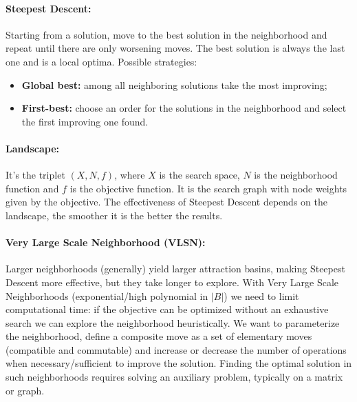 \documentclass{article}
\begin{document}
	\paragraph{Steepest Descent:} Starting from a solution, move to the best solution in the neighborhood and repeat until there are only worsening moves. The best solution is always the last one and is a local optima. Possible strategies: 
	\begin{itemize}
		\item \textbf{Global best:} among all neighboring solutions take the most improving;
		\item \textbf{First-best:} choose an order for the solutions in the neighborhood and select the first improving one found.\\
	\end{itemize}
	
	\paragraph{Landscape:} It's the triplet $(X,N,f)$, where $X$ is the search space, $N$ is the neighborhood function and $f$ is the objective function. It is the search graph with node weights given by the objective. The effectiveness of Steepest Descent depends on the landscape, the smoother it is the better the results.\\
	
	\paragraph{Very Large Scale Neighborhood (VLSN):} Larger neighborhoods (generally) yield larger attraction basins, making Steepest Descent more effective, but they take longer to explore. With Very Large Scale Neighborhoods (exponential/high polynomial in $|B|$) we need to limit computational time: if the objective can be optimized without an exhaustive search we can explore the neighborhood heuristically. We want to parameterize the neighborhood, define a composite move as a set of elementary moves (compatible and commutable) and increase or decrease the number of operations when necessary/sufficient to improve the solution. Finding the optimal solution in such neighborhoods requires solving an auxiliary problem, typically on a matrix or graph.\\
	
\end{document}
